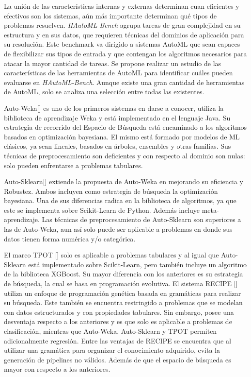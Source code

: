 La unión de las características internas y externas determinan cuan eficientes y efectivos son los sistemas, aún más importante determinan qué tipos de problemas 
resuelven.
\textit{HAutoML-Bench} agrupa tareas de gran complejidad en su estructura y en sus datos, que requieren técnicas del dominios de aplicación para su resolución. 
Este benchmark va dirigido a sistemas AutoML que sean capaces de flexibilizar sus tipos de entrada 
y que contengan los algoritmos necesarios para atacar la mayor cantidad de tareas. 
Se propone realizar un estudio de las características de las herramientas de AutoML para identificar cuáles pueden evaluarse en \textit{HAutoML-Bench}.
Aunque existe una gran cantidad de herramientas de AutoML, solo se analiza una selección entre todas las existentes.

Auto-Weka[\cite{8}] es uno de los primeros sistemas en darse a conocer, utiliza la biblioteca de aprendizaje Weka y está implementado en el lenguaje Java. 
Su estrategia de recorrido del Espacio de Búsqueda está encaminado a los algoritmos basados en optimización bayesiana. El mismo está formado por modelos de ML 
clásicos, ya sean lineales, basados en árboles, ensembles y otras familias. Sus técnicas de preprocesamiento son deficientes y con respecto al dominio son nulas: 
solo pueden enfrentarse a problemas tabulares.

Auto-Sklearn[\cite{9}] extiende la propuesta de Auto-Weka en mejorando su eficiencia y Robustez. Ambos incluyen como estrategia de búsqueda la optimización 
bayesiana. Una de sus diferencias radica en la biblioteca de algoritmos, ya que este se implementa sobre Scikit-Learn de Python. Además incluye meta-aprendizaje. 
Las técnicas de preprocesamiento de Auto-Sklearn son superiores a las de Auto-Weka, aun así solo puede ser aplicable a problemas en donde sus datos tienen forma 
numérica y/o categórica. 

El marco TPOT [\cite{65}] solo es aplicable a problemas tabulares y al igual que Auto-Sklearn está implementado sobre Scikit-Learn, pero también incluye un algoritmo de 
la biblioteca XGBoost. Su mayor diferencia con los anteriores es su estrategia de búsqueda, la cual se basa en programación evolutiva. 
El sistema RECIPE [\cite{64}] utiliza un enfoque de programación genética basada en gramáticas para realizar su búsqueda. Este también se encuentra restringido a problemas que se 
modelan con datos estructurados y con propiedades tabulares. Sin embargo, posee una desventaja respecto a los anteriores y es que solo es aplicable a problemas de 
clasificación, mientras que Auto-Weka, Auto-Sklearn y TPOT permiten adicionalmente regresión. Entre las ventajas de RECIPE se encuentra que al utilizar una 
gramática para organizar el conocimiento adquirido, evita la generación de pipelines no válidos. Además de que el 
espacio de búsqueda es mayor con respecto a los anteriores.

